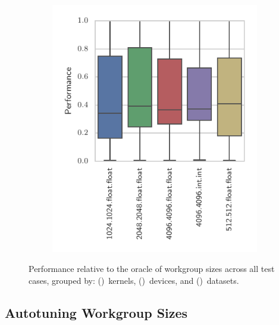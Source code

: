\documentclass[nonatbib,preprint,9pt]{sigplanconf}
\begin{document}
\begin{figure}
\begin{subfigure}[h]{.48\columnwidth}
    \vspace{-1.5em} %
    \caption{}
    \label{fig:performance-devices}
  \end{subfigure}
  ~%
  \begin{subfigure}[h]{.48\columnwidth}
    \centering
    \includegraphics[width=\columnwidth]{img/performance_datasets.pdf}
    \vspace{-1.5em} %
    \caption{}
    \label{fig:performance-datasets}
  \end{subfigure}
  \caption{%
    Performance relative to the oracle of workgroup sizes across all
    test cases, grouped by:
    ()~kernels,
    ()~devices, and
    ()~datasets.%
  }
  \label{fig:performances}
\end{figure}

\subsection{Autotuning Workgroup Sizes}
\end{document}
